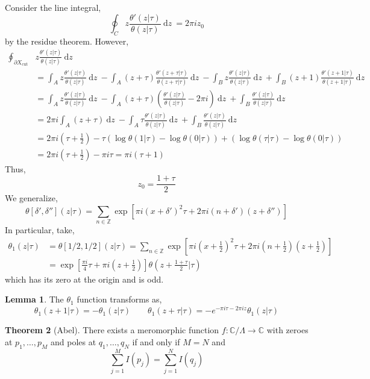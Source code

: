 \documentclass[12pt]{extarticle}
\newcommand{\Z}{\mathbb{Z}}
\newcommand{\C}{\mathbb{C}}
\renewcommand{\d}[1]{\: \mathrm{d}#1 \:}
\theoremstyle{definition}
\newtheorem{theorem}{Theorem}[section]
\newtheorem{lemma}[theorem]{Lemma}
\begin{document}
Consider the line integral,
\[ \oint_C z \frac{\theta'(z | \tau)}{\theta(z | \tau)} \d{z} = 2 \pi i z_0 \]
by the residue theorem. However,
\begin{align*}
\oint_{\partial X_{\text{cut}}} & z \frac{\theta'(z|\tau)}{\theta(z | \tau)} \d{z} 
\\
& =  \int_A z \frac{\theta'(z|\tau)}{\theta(z | \tau)} \d{z} - \int_A (z + \tau) \frac{\theta'(z + \tau | \tau)}{\theta(z + \tau | \tau)} \d{z} - \int_B z \frac{\theta'(z|\tau)}{\theta(z | \tau)} \d{z} + \int_B (z + 1) \frac{\theta'(z + 1 |\tau)}{\theta(z + 1 | \tau)} \d{z}
\\
& =  \int_A z \frac{\theta'(z|\tau)}{\theta(z | \tau)} \d{z} - \int_A (z + \tau) \left( \frac{\theta'(z  | \tau)}{\theta(z  | \tau)} - 2 \pi i \right) \d{z} + \int_B  \frac{\theta'(z  |\tau)}{\theta(z | \tau)} \d{z}
\\
& =  2 \pi i \int_A (z + \tau) \d{z}  - \int_A \tau \frac{\theta'(z  | \tau)}{\theta(z  | \tau)} \d{z} + \int_B  \frac{\theta'(z  |\tau)}{\theta(z | \tau)} \d{z}
\\
& =  2 \pi i \left( \tau + \tfrac{1}{2} \right)  - \tau \left( \log{\theta(1 | \tau)} - \log{\theta(0 | \tau)} \right) + \left( \log{\theta(\tau | \tau)} - \log{\theta(0 | \tau)} \right) 
\\
& =  2 \pi i \left( \tau + \tfrac{1}{2} \right) - \pi i \tau = \pi i (\tau + 1)
\end{align*}
Thus,
\[ z_0 = \frac{1 + \tau}{2} \]
We generalize,
\[ \theta[\delta', \delta''](z | \tau) = \sum_{n \in \Z} \exp{\left[\pi i (x + \delta')^2 \tau + 2 \pi i (n + \delta') (z + \delta'') \right]} \]
In particular, take,
\begin{align*}
\theta_1(z | \tau) & = \theta[1/2, 1/2](z | \tau) = \sum_{n \in \Z}  \exp{ \left[ \pi i (x + \tfrac{1}{2})^2 \tau + 2 \pi i (n + \tfrac{1}{2}) (z + \tfrac{1}{2}) \right] } 
\\
& = \exp{\left[ \tfrac{\pi i }{4} \tau + \pi i (z + \tfrac{1}{2}) \right]} \theta(z + \tfrac{1 + \tau}{2} | \tau) 
\end{align*} 
which has its zero at the origin and is odd.
\begin{lemma}
The $\theta_1$ function transforms as,
\[ \theta_1(z + 1 | \tau) = - \theta_1(z | \tau) \quad \quad \theta_1(z + \tau | \tau) = - e^{- \pi i \tau - 2 \pi i z} \theta_1(z | \tau) \]
\end{lemma}

\begin{theorem}[Abel]
There exists a meromorphic function $f : \C / \Lambda \to \C$ with zeroes at $p_1, \dots, p_M$ and poles at $q_1, \dots, q_N$ if and only if $M = N$ and 
\[ \sum_{j = 1}^M I(p_j) = \sum_{j = 1}^N I(q_j) \]
\end{theorem}
\end{document}
